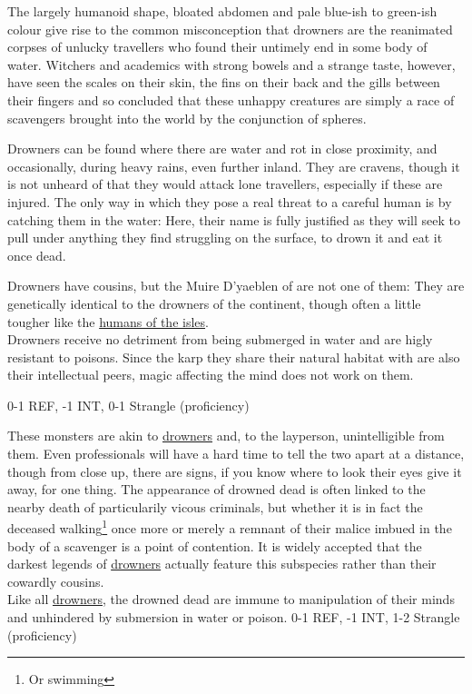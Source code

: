 

{
    The largely humanoid shape, bloated abdomen and pale blue-ish to green-ish colour give rise to the common
    misconception that drowners are the reanimated corpses of unlucky travellers who found their untimely end 
    in some body of water. Witchers and academics with strong bowels and a strange taste, however, have seen 
    the scales on their skin, the fins on their back and the gills between their fingers and so concluded that
    these unhappy creatures are simply a race of scavengers brought into the world by the conjunction of spheres.

    Drowners can be found where there are water and rot in close proximity, and occasionally, during heavy rains, 
    even further inland. They are cravens, though it is not unheard of that they would attack lone travellers, 
    especially if these are injured. The only way in which they pose a real threat to a careful human is by catching
    them in the water: Here, their name is fully justified as they will seek to pull under anything they find 
    struggling on the surface, to drown it and eat it once dead. 

    Drowners have cousins, but the Muire D'yaeblen of  are not one of them: They are 
    genetically identical to the drowners of the continent, though often a little tougher \textendash like the
    \hyperref[people:skellige]{humans of the isles}.
    \\[1.5ex]
    Drowners receive no detriment from being submerged in water and are higly resistant to poisons. Since the karp
    they share their natural habitat with are also their intellectual peers, magic affecting the mind does not work
    on them.
}{
    0-1 REF, -1 INT, 0-1 Strangle (proficiency)
}

{
    These monsters are akin to \hyperref[monster:drowner]{drowners} and, to the layperson, unintelligible from them. Even
    professionals will have a hard time to tell the two apart at a distance, though from close up, there are signs,
    if you know where to look \textendash their eyes give it away, for one thing. The appearance of drowned dead is 
    often linked to the nearby death of particularily vicous criminals, but whether it is in fact the deceased 
    walking\footnote{Or swimming} once more or merely a remnant of their malice imbued in the body of a scavenger
    is a point of contention. It is widely accepted that the darkest legends of \hyperref[monster:drowner]{drowners}
    actually feature this subspecies rather than their cowardly cousins.
    \\[1.5ex]
    Like all \hyperref[monster:drowner]{drowners}, the drowned dead are immune to manipulation of their minds and
    unhindered by submersion in water or poison.
}{
    0-1 REF, -1 INT, 1-2 Strangle (proficiency)
}

